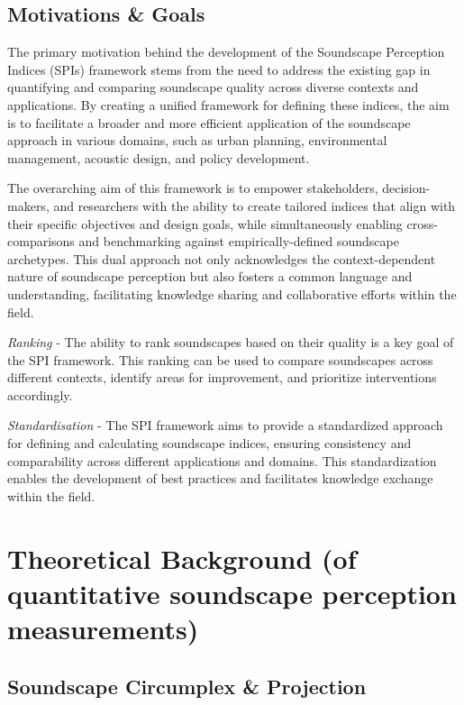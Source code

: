 \documentclass[
  authoryear,
  preprint,
  3p]{elsarticle}
\begin{document}
\subsection{Motivations \& Goals}\label{motivations-goals}

The primary motivation behind the development of the Soundscape
Perception Indices (SPIs) framework stems from the need to address the
existing gap in quantifying and comparing soundscape quality across
diverse contexts and applications. By creating a unified framework for
defining these indices, the aim is to facilitate a broader and more
efficient application of the soundscape approach in various domains,
such as urban planning, environmental management, acoustic design, and
policy development.

The overarching aim of this framework is to empower stakeholders,
decision-makers, and researchers with the ability to create tailored
indices that align with their specific objectives and design goals,
while simultaneously enabling cross-comparisons and benchmarking against
empirically-defined soundscape archetypes. This dual approach not only
acknowledges the context-dependent nature of soundscape perception but
also fosters a common language and understanding, facilitating knowledge
sharing and collaborative efforts within the field.

\emph{Ranking} - The ability to rank soundscapes based on their quality
is a key goal of the SPI framework. This ranking can be used to compare
soundscapes across different contexts, identify areas for improvement,
and prioritize interventions accordingly.

\emph{Standardisation} - The SPI framework aims to provide a
standardized approach for defining and calculating soundscape indices,
ensuring consistency and comparability across different applications and
domains. This standardization enables the development of best practices
and facilitates knowledge exchange within the field.

\section{Theoretical Background (of quantitative soundscape perception
measurements)}\label{theoretical-background-of-quantitative-soundscape-perception-measurements}

\subsection{Soundscape Circumplex \&
Projection}\label{soundscape-circumplex-projection}
\end{document}
